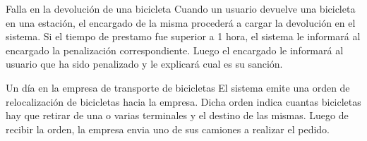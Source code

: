 \begin{subsection}{Falla en la devolución de una bicicleta}
Cuando un usuario devuelve una bicicleta en una estación, el encargado de la misma procederá a cargar la devolución en el sistema. Si el tiempo de prestamo fue superior a 1 hora, el sistema le informará al encargado la penalización correspondiente. Luego el encargado le informará al usuario que ha sido penalizado y le explicará cual es su sanción.

\end{subsection} 

\begin{subsection}{Un día en la empresa de transporte de bicicletas}
El sistema emite una orden de relocalización de bicicletas hacia la empresa. Dicha orden indica cuantas bicicletas hay que retirar de una o varias terminales y el destino de las mismas. Luego de recibir la orden, la empresa envia uno de sus camiones a realizar el pedido.

\end{subsection}
